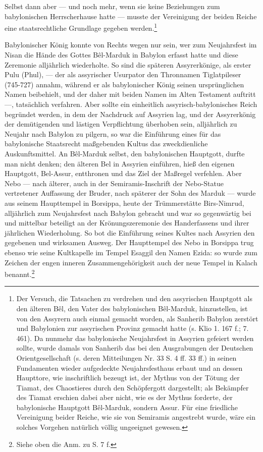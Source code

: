 \documentclass[a4paper, 11pt, oneside, polutonikogreek, german]{article}
\begin{document}
Selbst dann aber --- und noch mehr, wenn sie keine Beziehungen zum babylonischen Herrscherhause hatte --- musste der Vereinigung der beiden Reiche eine staatsrechtliche Grundlage gegeben werden.\footnote{Der Versuch, die Tatsachen zu verdrehen und den assyrischen Hauptgott als den älteren Bêl, den Vater des babylonischen Bêl-Marduk, hinzustellen, ist von den Assyrern auch einmal gemacht worden, als Sanherib Babylon zerstört und Babylonien zur assyrischen Provinz gemacht hatte (s. Klio 1. 167 f.; 7. 461). Da nunmehr das babylonische Neujahrsfest in Assyrien gefeiert werden sollte, wurde damals von Sanherib das bei den Ausgrabungen der Deutschen Orientgesellschaft (s. deren Mitteilungen Nr. 33 S. 4 ff. 33 ff.) in seinen Fundamenten wieder aufgedeckte Neujahrsfesthaus erbaut und an dessen Haupttore, wie inschriftlich bezeugt ist, der Mythus von der Tötung der Tiamat, des Chaostieres durch den Schöpfergott dargestellt; als Bekämpfer des Tiamat erschien dabei aber nicht, wie es der Mythus forderte, der babylonische Hauptgott Bêl-Marduk, sondern Assur. Für eine friedliche Vereinigung beider Reiche, wie sie von Semiramis angestrebt wurde, wäre ein solches Vorgehen natürlich völlig ungeeignet gewesen.}

Babylonischer König konnte von Rechts wegen nur sein, wer zum Neujahrsfest im Nisan die Hände des Gottes Bêl-Marduk in Babylon erfasst hatte und diese Zeremonie alljährlich wiederholte. So sind die späteren Assyrerkönige, als erster Pulu (Phul), --- der als assyrischer Usurpator den Thronnamen Tiglatpileser (745-727) annahm, während er als babylonischer König seinen ursprünglichen Namen beibehielt, und der daher mit beiden Namen im Alten Testament auftritt ---, tatsächlich verfahren. Aber sollte ein einheitlich assyrisch-babylonisches Reich begründet werden, in dem der Nachdruck auf Assyrien lag, und der Assyrerkönig der demütigenden und lästigen Verpflichtung überhoben sein, alljährlich zu Neujahr nach Babylon zu pilgern, so war die Einführung eines für das babylonische Staatsrecht maßgebenden Kultus das zweckdienliche Auskunftsmittel. An Bêl-Marduk selbst, den babylonischen Hauptgott, durfte man nicht denken; den älteren Bel in Assyrien einführen, hieß den eigenen Hauptgott, Bel-Assur, entthronen und das Ziel der Maßregel verfehlen. Aber Nebo --- nach älterer, auch in der Semiramis-Inschrift der Nebo-Statue vertretener Auffassung der Bruder, nach späterer der Sohn des Marduk --- wurde aus seinem Haupttempel in Borsippa, heute der Trümmerstätte Birs-Nimrud, alljährlich zum Neujahrsfest nach Babylon gebracht und war so gegenwärtig bei und mittelbar beteiligt an der Krönungszeremonie des Handerfassens und ihrer jährlichen Wiederholung. So bot die Einführung seines Kultes nach Assyrien den gegebenen und wirksamen Ausweg. Der Haupttempel des Nebo in Borsippa trug ebenso wie seine Kultkapelle im Tempel Esaggil den Namen Ezida: so wurde zum Zeichen der engen inneren Zusammengehörigkeit auch der neue Tempel in Kalach benannt.\footnote{Siehe oben die Anm. zu S. 7 f.}
\end{document}
